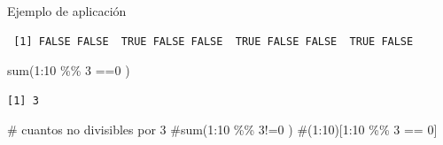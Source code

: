\documentclass[
  ignorenonframetext,
  aspectratio=169,
  spanish,
]{beamer}
\newenvironment{Shaded}{\begin{snugshade}}{\end{snugshade}}
\newcommand{\CommentTok}[1]{\textcolor[rgb]{0.37,0.37,0.37}{#1}}
\newcommand{\DecValTok}[1]{\textcolor[rgb]{0.68,0.00,0.00}{#1}}
\newcommand{\FunctionTok}[1]{\textcolor[rgb]{0.28,0.35,0.67}{#1}}
\newcommand{\NormalTok}[1]{\textcolor[rgb]{0.00,0.23,0.31}{#1}}
\newcommand{\SpecialCharTok}[1]{\textcolor[rgb]{0.37,0.37,0.37}{#1}}
\begin{document}
\begin{frame}[fragile]{Ejemplo de aplicación}
\begin{verbatim}
 [1] FALSE FALSE  TRUE FALSE FALSE  TRUE FALSE FALSE  TRUE FALSE
\end{verbatim}

\begin{Shaded}
\begin{Highlighting}[]
\FunctionTok{sum}\NormalTok{(}\DecValTok{1}\SpecialCharTok{:}\DecValTok{10} \SpecialCharTok{\%\%} \DecValTok{3} \SpecialCharTok{==}\DecValTok{0}\NormalTok{ )  }
\end{Highlighting}
\end{Shaded}

\begin{verbatim}
[1] 3
\end{verbatim}

\begin{Shaded}
\begin{Highlighting}[]
\CommentTok{\# cuantos no divisibles por 3 }
\CommentTok{\#sum(1:10 \%\% 3!=0 ) }
\CommentTok{\#(1:10)[1:10 \%\% 3 == 0]}
\end{Highlighting}
\end{Shaded}
\end{frame}
\end{document}

